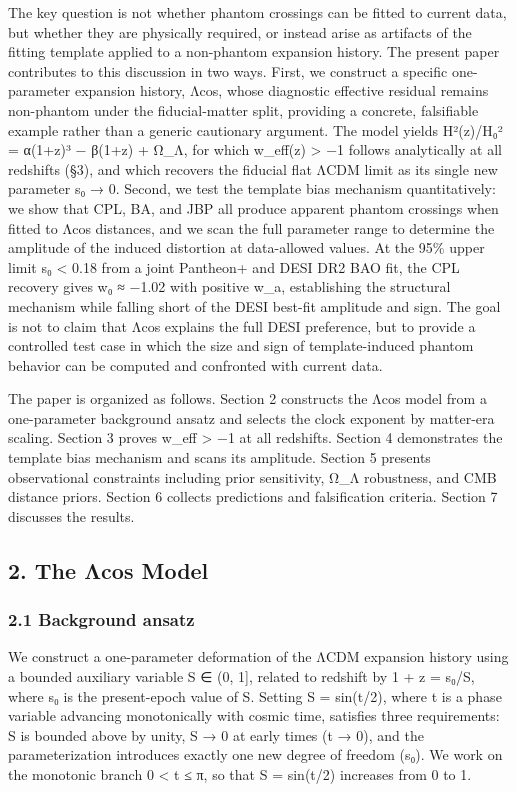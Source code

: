 The key question is not whether phantom crossings can be fitted to
current data, but whether they are physically required, or instead arise
as artifacts of the fitting template applied to a non-phantom expansion
history. The present paper contributes to this discussion in two ways.
First, we construct a specific one-parameter expansion history, Λcos,
whose diagnostic effective residual remains non-phantom under the
fiducial-matter split, providing a concrete, falsifiable example rather
than a generic cautionary argument. The model yields H²(z)/H₀² = α(1+z)³
− β(1+z) + Ω\_Λ, for which w\_eff(z) \textgreater{} −1 follows
analytically at all redshifts (§3), and which recovers the fiducial flat
ΛCDM limit as its single new parameter s₀ → 0. Second, we test the
template bias mechanism quantitatively: we show that CPL, BA, and JBP
all produce apparent phantom crossings when fitted to Λcos distances,
and we scan the full parameter range to determine the amplitude of the
induced distortion at data-allowed values. At the 95\% upper limit s₀
\textless{} 0.18 from a joint Pantheon+ and DESI DR2 BAO fit, the CPL
recovery gives w₀ ≈ −1.02 with positive w\_a, establishing the
structural mechanism while falling short of the DESI best-fit amplitude
and sign. The goal is not to claim that Λcos explains the full DESI
preference, but to provide a controlled test case in which the size and
sign of template-induced phantom behavior can be computed and confronted
with current data.

The paper is organized as follows. Section 2 constructs the Λcos model
from a one-parameter background ansatz and selects the clock exponent by
matter-era scaling. Section 3 proves w\_eff \textgreater{} −1 at all
redshifts. Section 4 demonstrates the template bias mechanism and scans
its amplitude. Section 5 presents observational constraints including
prior sensitivity, Ω\_Λ robustness, and CMB distance priors. Section 6
collects predictions and falsification criteria. Section 7 discusses the
results.

\subsection{2. The Λcos Model}\label{the-ux3bbcos-model}

\subsubsection{2.1 Background ansatz}\label{background-ansatz}

We construct a one-parameter deformation of the ΛCDM expansion history
using a bounded auxiliary variable S ∈ (0, 1{]}, related to redshift by
1 + z = s₀/S, where s₀ is the present-epoch value of S. Setting S =
sin(t/2), where t is a phase variable advancing monotonically with
cosmic time, satisfies three requirements: S is bounded above by unity,
S → 0 at early times (t → 0), and the parameterization introduces
exactly one new degree of freedom (s₀). We work on the monotonic branch
0 \textless{} t ≤ π, so that S = sin(t/2) increases from 0 to 1.

